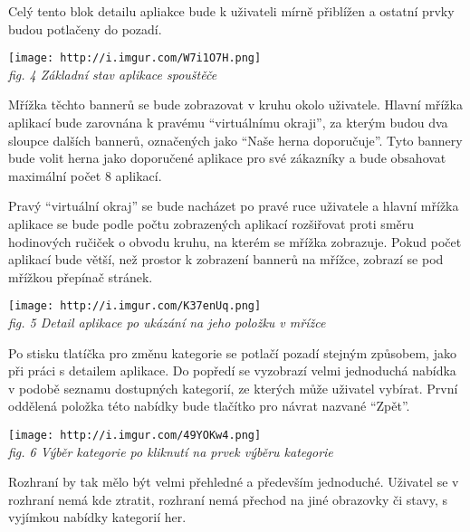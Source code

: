 Celý tento blok
detailu apliakce bude k uživateli mírně přiblížen a ostatní prvky budou
potlačeny do pozadí.

\texttt{[image: http://i.imgur.com/W7i1O7H.png]}\\
\emph{fig. 4 Základní stav aplikace spouštěče}

Mřížka těchto bannerů se bude zobrazovat v kruhu okolo uživatele. Hlavní
mřížka aplikací bude zarovnána k pravému ``virtuálnímu okraji'', za
kterým budou dva sloupce dalších bannerů, označených jako ``Naše herna
doporučuje''. Tyto bannery bude volit herna jako doporučené aplikace pro
své zákazníky a bude obsahovat maximální počet 8 aplikací. 

Pravý ``virtuální okraj'' se bude nacházet po pravé ruce uživatele a hlavní
mřížka aplikace se bude podle počtu zobrazených aplikací rozšiřovat
proti směru hodinových ručiček o obvodu kruhu, na kterém se mřížka
zobrazuje. Pokud počet aplikací bude větší, než prostor k zobrazení
bannerů na mřížce, zobrazí se pod mřížkou přepínač stránek.

\texttt{[image: http://i.imgur.com/K37enUq.png]}\\
\emph{fig. 5 Detail aplikace po ukázání na jeho položku v mřížce}

Po stisku tlatíčka pro změnu kategorie se potlačí pozadí stejným
způsobem, jako při práci s detailem aplikace. Do popředí se vyzobrazí
velmi jednoduchá nabídka v podobě seznamu dostupných kategorií, ze
kterých může uživatel vybírat. První oddělená položka této nabídky bude
tlačítko pro návrat nazvané ``Zpět''.

\texttt{[image: http://i.imgur.com/49YOKw4.png]}\\
\emph{fig. 6 Výběr kategorie po kliknutí na prvek výběru kategorie}

Rozhraní by tak mělo být velmi přehledné a především jednoduché.
Uživatel se v rozhraní nemá kde ztratit, rozhraní nemá přechod na jiné
obrazovky či stavy, s vyjímkou nabídky kategorií her.
